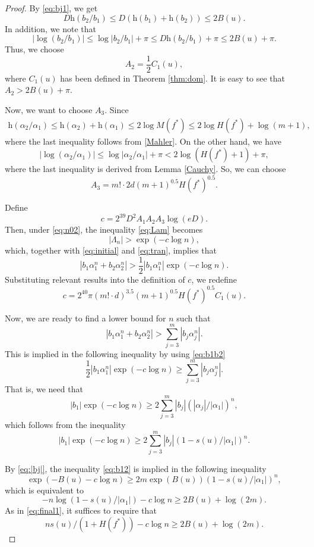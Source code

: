 \documentclass[12pt]{amsart}
\theoremstyle{definition}
\theoremstyle{remark}
\numberwithin{equation}{section}
\begin{document}
\begin{proof}
By \eqref{eq:bj1}, we get
$$
D{\mathrm{h}}(b_2/b_1) \le D ({\mathrm{h}}(b_1)+{\mathrm{h}}(b_2)) \le 2B(u).
$$
 In addition, we note that
$$
| \log (b_2/b_1) | \le \log | b_2/b_1 | + \pi \le D {\mathrm{h}}(b_2/b_1)+ \pi \le  2B(u)+\pi.
$$
Thus, we choose 
$$
A_2 = \frac{1}{2} C_1(u),
$$
where $C_1(u)$ has been defined in Theorem \ref{thm:dom}. It is easy to see that $A_2 > 2B(u)+\pi$.

Now, we want to choose $A_3$. Since
\begin{align*}
{\mathrm{h}}({\alpha}_2/{\alpha}_1) \le {\mathrm{h}}({\alpha}_2) + {\mathrm{h}}({\alpha}_1)
 \le 2\log M(f^*) \le 2\log H(f^*) + \log (m+1),
\end{align*}
where the last inequality follows from \eqref{Mahler}.
On the other hand, we have
$$
|\log ({\alpha}_2/{\alpha}_1) | \le \log |{\alpha}_2/{\alpha}_1| + \pi < 2 \log (H(f^*)+1) + \pi,
$$
where the last inequality is derived from Lemma \ref{Cauchy}.
So, we can choose
$$
A_3= m! \cdot 2d (m+1)^{0.5} H(f^*)^{0.5}.
$$

Define
$$
c=2^{39}D^2A_1A_2A_3 \log (eD).
$$
Then, under \eqref{eq:n02}, the inequality \eqref{eq:Lam} becomes
\begin{equation}
\label{eq:Lam1}
|\Lambda_n | > \exp(-c\log n),
\end{equation}
which, together with \eqref{eq:initial} and \eqref{eq:tran}, implies that
\begin{equation}
\label{eq:b1b2}
|b_1{\alpha}_1^n+b_2{\alpha}_2^n| > \frac{1}{2}|b_1{\alpha}_1^n| \exp(-c\log n).
\end{equation}
Substituting relevant results into the definition of $c$, we redefine
$$
c=2^{40}\pi (m!\cdot d)^{3.5}(m+1)^{0.5}H(f^*)^{0.5}C_1(u).
$$

Now, we are ready to find a lower bound for $n$ such that
$$
|b_1{\alpha}_1^n+b_2{\alpha}_2^n| > \sum_{j=3}^{m}|b_j\alpha_j^n|.
$$
This is implied in the following inequality by using \eqref{eq:b1b2}
$$
\frac{1}{2}|b_1{\alpha}_1^n| \exp(-c\log n) \ge  \sum_{j=3}^{m}|b_j\alpha_j^n|.
$$
That is, we need that
$$
|b_1| \exp(-c\log n) \ge 2\sum_{j=3}^{m}|b_j|\left(|\alpha_j|/|{\alpha}_1|\right)^n,
$$
which follows from the inequality
\begin{equation}
\label{eq:b12}
|b_1| \exp(-c\log n) \ge 2\sum_{j=3}^{m}|b_j|\left(1-s(u)/|{\alpha}_1|\right)^n.
\end{equation}

By \eqref{eq:|bj|}, the inequality \eqref{eq:b12} is implied in the following inequality
$$
\exp(-B(u)-c\log n) \ge 2m \exp(B(u)) \left(1-s(u)/|{\alpha}_1|\right)^n,
$$
which is equivalent to
$$
-n\log (1-s(u)/|{\alpha}_1|) - c\log n \ge 2B(u)+ \log (2m).
$$
As in \eqref{eq:final1}, it suffices to require that
\begin{equation}
\label{eq:n1}
ns(u)/(1+H(f^*))-c\log n \ge 2B(u)+ \log (2m).
\end{equation}


\end{proof}
\end{document}
